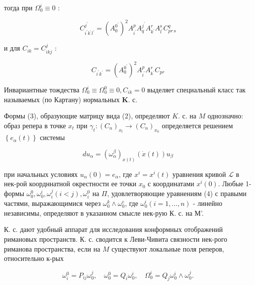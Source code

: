 \documentclass[10pt]{article}
\begin{document}
тогда при $\Omega_{0}^{i} \equiv 0$ :



\[

C_{i^{\prime} k^{\prime} l^{\prime}}^{j^{\prime}}=\left(A_{0}^{0^{\prime}}\right)^{2} A_{i^{\prime}}^{p} A_{q}^{j^{\prime}} A_{k^{\prime}}^{r} A_{l^{\prime}}^{\mathrm{s}} C_{p r \mathrm{~s}}^{q}

\]



и для $C_{i k}=C_{i k j}^{j}$ :



\[

C_{i^{\prime} k^{\prime}}=\left(A_{0}^{0^{\prime}}\right)^{2} A_{i^{\prime}}^{p} A_{k^{\prime}}^{r} C_{p r}

\]



Инвариантные тождества $\Omega_{0}^{i} \equiv \Omega_{0}^{0} \equiv 0, C_{i k}=0$ выделяет специальный класс так называемых (по Картану) нормальных $\mathbf{K}$. с.



Формы (3), образующие матрицу вида (2), определяют $K$. с. на $M$ однозначно: образ репера в точке $x_{t}$ при $\gamma_{t}:\left(C_{n}\right)_{x_{t}} \rightarrow\left(C_{n}\right)_{x_{0}}$ определяется решением $\left\{e_{\alpha}(t)\right\}$ системы



\[

d u_{\alpha}=\left(\omega_{\alpha}^{\beta}\right)_{x(t)}(\dot{x}(t)) u_{\beta}

\]



при начальных условиях $u_{\alpha}(0)=e_{\alpha}$, где $x^{i}=x^{i}(t)$ уравнения кривой $\mathscr{L}$ в нек-рой коордннатной окрестности ее точки $x_{0}$ с координатами $x^{i}(0)$. Любые 1-формы $\omega_{0}^{0}, \omega_{0}^{i}, \omega_{i}^{j}(i<j), \omega_{i}^{0}$ на $\Pi$, удовлетворяющие уравнениям (4) с правыми частями, выражающимися через $\omega_{0}^{k} \wedge \omega_{0}^{e}$, где $\omega_{0}^{i}(i=1, \ldots, n)$ - линейно независимы, определяют в указанном смысле нек-рую К. с. на М'.



К. с. дают удобный аппарат для исследования конформных отображений римановых пространств. К. с. сводится к Леви-Чивита связности нек-рого риманова пространства, если на $M$ существуют локальные поля реперов, относительно к-рых



\[

\omega_{i}^{0}=P_{i j} \omega_{0}^{j}, \quad \omega_{0}^{0}=Q_{i} \omega_{0}^{i}, \quad \Omega_{0}^{i}=Q_{j} \omega_{0}^{i} \wedge \omega_{0}^{j} .

\]
\end{document}
